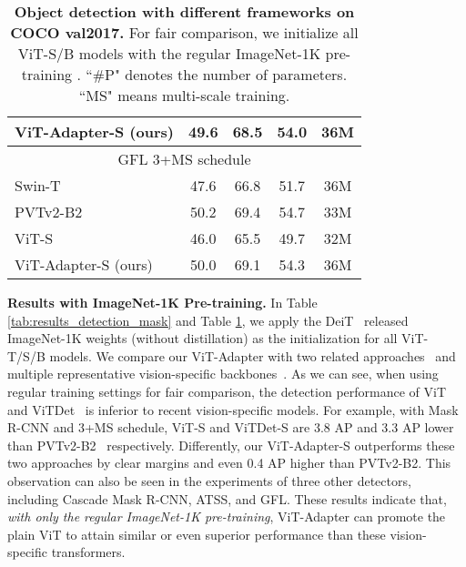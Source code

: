 \documentclass{article} \usepackage{iclr2023_conference,times}
\begin{document}
\begin{table}[t]
\begin{minipage}{0.4\textwidth}
{{\begin{tabular}{lcccc}
	   \rowcolor{gray!20}
	    ViT-Adapter-S (ours) & 49.6 & 68.5 & 54.0 & 36M  \\ 
	    \midrule
	    \multicolumn{5}{c}{GFL 3+MS schedule} \\
	    Swin-T \citep{liu2021swin} & 47.6 & 66.8 & 51.7 & 36M  \\ 
	    PVTv2-B2 \citep{wang2021pvtv2} & 50.2 & 69.4 & 54.7 & 33M  \\
ViT-S~\citep{li2021benchmarking} & 46.0 & 65.5 & 49.7 & 32M   \\
	    \rowcolor{gray!20}
	    ViT-Adapter-S (ours) & 50.0 & 69.1 & 54.3 & 36M  \\
	    \bottomrule
    \end{tabular}}
    }
\end{minipage}
\caption{\textbf{Object detection with different frameworks on COCO val2017.} 
    For fair comparison, we initialize all ViT-S/B models with the regular ImageNet-1K pre-training \citep{touvron2021training}.
    ``\#P" denotes the number of parameters. 
    ``MS" means multi-scale training.
    }
\label{tab:results_detection_strong_heads}
\end{table}
%
 


\noindent \textbf{Results with ImageNet-1K Pre-training.} 
In Table \ref{tab:results_detection_mask} and Table \ref{tab:results_detection_strong_heads}, we apply the DeiT~\citep{touvron2021training} released ImageNet-1K weights (without distillation) as the initialization for all ViT-T/S/B models. 
We compare our ViT-Adapter with two related approaches~\citep{li2021benchmarking,li2022exploring} and multiple representative vision-specific backbones~\citep{wang2021pyramid,wang2021pvtv2,huang2021shuffle,liu2021swin,yang2021focal}. 
As we can see, when using regular training settings for fair comparison, the detection performance of ViT~\citep{li2021benchmarking} and ViTDet~\citep{li2022exploring} is inferior to recent vision-specific models.
For example, with Mask R-CNN and 3+MS schedule, ViT-S and ViTDet-S are 3.8 AP and 3.3 AP lower than PVTv2-B2~\citep{wang2021pvtv2} respectively.
Differently, our ViT-Adapter-S outperforms these two approaches by clear margins and even 0.4 AP higher than PVTv2-B2.
This observation can also be seen in the experiments of three other detectors, including Cascade Mask R-CNN, ATSS, and GFL.
These results indicate that, \emph{with only the regular ImageNet-1K pre-training}, ViT-Adapter can promote the plain ViT to attain similar or even superior performance than these vision-specific transformers.
\end{document}
